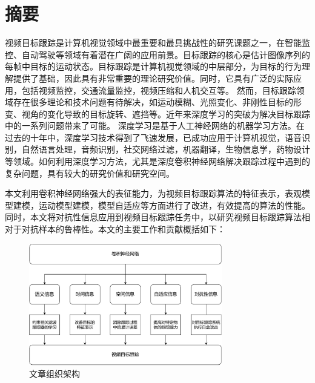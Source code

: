 \maketitle%
\MAKETITLE%
\makedeclaration%
\intobmk\chapter*{摘\quad 要}%
\setcounter{page}{1}%

视频目标跟踪是计算机视觉领域中最重要和最具挑战性的研究课题之一，在智能监控、自动驾驶等领域有着潜在广阔的应用前景。目标跟踪的核心是估计图像序列的每帧中目标的运动状态。目标跟踪是计算机视觉领域的中层部分，为目标的行为理解提供了基础，因此具有非常重要的理论研究价值。同时，它具有广泛的实际应用，包括视频监控，交通流量监控，视频压缩和人机交互等。
然而，目标跟踪领域存在很多理论和技术问题有待解决，如运动模糊、光照变化、非刚性目标的形变、视角的变化导致的目标旋转、遮挡等。近年来深度学习的突破为解决目标跟踪中的一系列问题带来了可能。
深度学习是基于人工神经网络的机器学习方法。在过去的十年中，深度学习技术得到了飞速发展，已成功应用于计算机视觉，语音识别，自然语言处理，音频识别，社交网络过滤，机器翻译，生物信息学，药物设计等领域。如何利用深度学习方法，尤其是深度卷积神经网络解决跟踪过程中遇到的复杂问题，具有较大的研究价值和研究空间。

本文利用卷积神经网络强大的表征能力，为视频目标跟踪算法的特征表示，表观模型建模，运动模型建模，模型自适应等方面进行了改进，有效提高的算法的性能。同时，本文将对抗性信息应用到视频目标跟踪任务中，以研究视频目标跟踪算法相对于对抗样本的鲁棒性。本文的主要工作和贡献概括如下：

\begin{figure}
\centering
\includegraphics[width=0.75\textwidth]{Img/paper_arch.pdf}
\caption{文章组织架构}
\end{figure}


